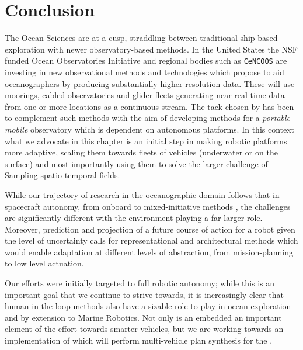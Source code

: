 \section{Conclusion}
\label{sec:conclusion}


The Ocean Sciences are at a cusp, straddling between traditional
ship-based exploration with newer observatory-based methods. In the
United States the NSF funded Ocean Observatories Initiative \cite{ooi}
and regional bodies such as \texttt{CeNCOOS} \cite{cencoos} are
investing in new observational methods and technologies which propose
to aid oceanographers by producing substantially higher-resolution
data. These will use moorings, cabled observatories and glider fleets
generating near real-time data from one or more locations as a
continuous stream. The tack chosen by \can has been to complement such
methods with the aim of developing methods for a \emph{portable
  mobile} observatory which is dependent on autonomous platforms. In
this context what we advocate in this chapter is an initial step in
making robotic platforms more adaptive, scaling them towards fleets of
vehicles (underwater or on the surface) and most importantly using
them to solve the larger challenge of Sampling spatio-temporal fields.

While our trajectory of research in the oceanographic domain follows
that in spacecraft autonomy, from onboard \cite{mus98} to
mixed-initiative methods \cite{bresina05}, the challenges are
significantly different with the environment playing a far larger
role. Moreover, prediction and projection of a future course of action
for a robot given the level of uncertainty calls for representational
and architectural methods which would enable adaptation at different
levels of abstraction, from mission-planning to low level actuation. 

Our efforts were initially targeted to full robotic autonomy; while
this is an important goal that we continue to strive towards, it is
increasingly clear that human-in-the-loop methods also have a sizable
role to play in ocean exploration and by extension to Marine
Robotics. Not only is an embedded \rx an important element of the
effort towards smarter vehicles, but we are working towards an
implementation of \rx which will perform multi-vehicle plan synthesis
for the \od.

